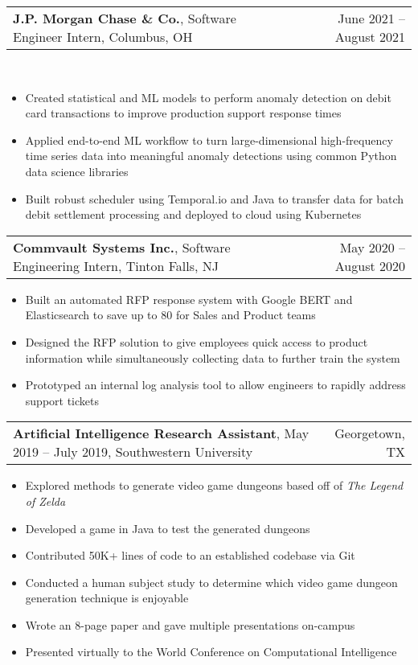 \documentclass[letterpaper,11pt]{article}
\makeatletter
\newcommand{\resumeItem}[1]{
  \item\small{
    {#1 \vspace{-2pt}}
  }
}
\newcommand{\resumeSubheading}[4]{
  \vspace{-2pt}\item
    \begin{tabular*}{0.97\textwidth}[t]{l@{\extracolsep{\fill}}r}
      \textbf{#1}, #2, #3 & #4 \\
    \end{tabular*}\vspace{-7pt}
}
\newcommand{\resumeSubSubheading}[2]{
    \item
    \begin{tabular*}{0.97\textwidth}{l@{\extracolsep{\fill}}r}
      \textit{\small#1} & \textit{\small #2} \\
    \end{tabular*}\vspace{-7pt}
}
\newcommand{\resumeSubHeadingListEnd}{\end{itemize}}
\newcommand{\resumeItemListStart}{\begin{itemize}}
\newcommand{\resumeItemListEnd}{\end{itemize}\vspace{-5pt}}
\makeatother
\begin{document}
    \resumeSubheading
    {J.P. Morgan Chase \& Co.}{Software Engineer Intern}{Columbus, OH}{June 2021 -- August 2021}\\
      \resumeItemListStart
        \resumeItem{Created statistical and ML models to perform anomaly detection on debit card transactions to improve
        production support response times}
        \resumeItem{Applied end-to-end ML workflow to turn large-dimensional high-frequency time series data into
        meaningful anomaly detections using common Python data science libraries}
        \resumeItem{Built robust scheduler using Temporal.io and Java to transfer data for batch debit settlement processing
        and deployed to cloud using Kubernetes}
      \resumeItemListEnd
      

    \resumeSubheading
      {Commvault Systems Inc.}{Software Engineering Intern}{Tinton Falls, NJ}{May 2020 -- August 2020}
      \resumeItemListStart
        \resumeItem{Built an automated RFP response system with Google BERT and Elasticsearch to save up to 80%
        for Sales and Product teams}
        \resumeItem{Designed the RFP solution to give employees quick access to product information while simultaneously
        collecting data to further train the system}
        \resumeItem{Prototyped an internal log analysis tool to allow engineers to rapidly address support tickets}
    \resumeItemListEnd

    \resumeSubheading
      {Artificial Intelligence Research Assistant}{May 2019 -- July 2019}
      {Southwestern University}{Georgetown, TX}
      \resumeItemListStart
        \resumeItem{Explored methods to generate video game dungeons based off of \emph{The Legend of Zelda}}
        \resumeItem{Developed a game in Java to test the generated dungeons}
        \resumeItem{Contributed 50K+ lines of code to an established codebase via Git}
        \resumeItem{Conducted  a human subject study to determine which video game dungeon generation technique is enjoyable}
        \resumeItem{Wrote an 8-page paper and gave multiple presentations on-campus}
        \resumeItem{Presented virtually to the World Conference on Computational Intelligence}
      \resumeItemListEnd
\end{document}
